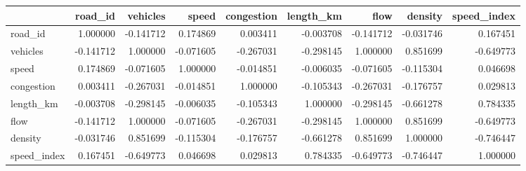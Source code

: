 \begin{tabular}{lrrrrrrrr}
\toprule
 & road_id & vehicles & speed & congestion & length_km & flow & density & speed_index \\
\midrule
road_id & 1.000000 & -0.141712 & 0.174869 & 0.003411 & -0.003708 & -0.141712 & -0.031746 & 0.167451 \\
vehicles & -0.141712 & 1.000000 & -0.071605 & -0.267031 & -0.298145 & 1.000000 & 0.851699 & -0.649773 \\
speed & 0.174869 & -0.071605 & 1.000000 & -0.014851 & -0.006035 & -0.071605 & -0.115304 & 0.046698 \\
congestion & 0.003411 & -0.267031 & -0.014851 & 1.000000 & -0.105343 & -0.267031 & -0.176757 & 0.029813 \\
length_km & -0.003708 & -0.298145 & -0.006035 & -0.105343 & 1.000000 & -0.298145 & -0.661278 & 0.784335 \\
flow & -0.141712 & 1.000000 & -0.071605 & -0.267031 & -0.298145 & 1.000000 & 0.851699 & -0.649773 \\
density & -0.031746 & 0.851699 & -0.115304 & -0.176757 & -0.661278 & 0.851699 & 1.000000 & -0.746447 \\
speed_index & 0.167451 & -0.649773 & 0.046698 & 0.029813 & 0.784335 & -0.649773 & -0.746447 & 1.000000 \\
\bottomrule
\end{tabular}
